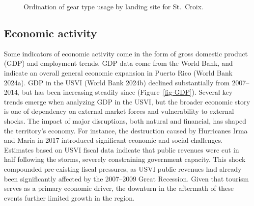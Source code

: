 \documentclass[
  letterpaper,
  oneside,
  open=any]{scrbook}
\begin{document}
\begin{figure}


\caption{\label{fig-NMDSSTX}Ordination of gear type usage by landing
site for St.~Croix.}

\end{figure}%

\subsection{Economic activity}\label{economic-activity}

Some indicators of economic activity come in the form of gross domestic
product (GDP) and employment trends. GDP data come from the World Bank,
and indicate an overall general economic expansion in Puerto Rico (World
Bank 2024a). GDP in the USVI (World Bank 2024b) declined substantially
from 2007--2014, but has been increasing steadily since
(Figure~\ref{fig-GDP}). Several key trends emerge when analyzing GDP in
the USVI, but the broader economic story is one of dependency on
external market forces and vulnerability to external shocks. The impact
of major disruptions, both natural and financial, has shaped the
territory's economy. For instance, the destruction caused by Hurricanes
Irma and Maria in 2017 introduced significant economic and social
challenges. Estimates based on USVI fiscal data indicate that public
revenues were cut in half following the storms, severely constraining
government capacity. This shock compounded pre-existing fiscal
pressures, as USVI public revenues had already been significantly
affected by the 2007--2009 Great Recession. Given that tourism serves as
a primary economic driver, the downturn in the aftermath of these events
further limited growth in the region.
\end{document}
